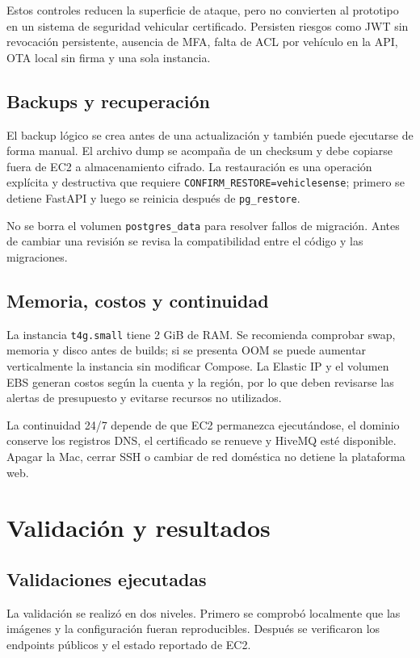 \documentclass[12pt,a4paper,oneside]{report}
\newcommand{\code}[1]{\texttt{\small #1}}
\begin{document}
Estos controles reducen la superficie de ataque, pero no convierten al prototipo en
un sistema de seguridad vehicular certificado. Persisten riesgos como JWT sin
revocación persistente, ausencia de MFA, falta de ACL por vehículo en la API, OTA
local sin firma y una sola instancia.

\section{Backups y recuperación}

El backup lógico se crea antes de una actualización y también puede ejecutarse de
forma manual. El archivo dump se acompaña de un checksum y debe copiarse fuera de
EC2 a almacenamiento cifrado. La restauración es una operación explícita y
destructiva que requiere \code{CONFIRM\_RESTORE=vehiclesense}; primero se detiene
FastAPI y luego se reinicia después de \code{pg\_restore}.

No se borra el volumen \code{postgres\_data} para resolver fallos de migración.
Antes de cambiar una revisión se revisa la compatibilidad entre el código y las
migraciones.

\section{Memoria, costos y continuidad}

La instancia \code{t4g.small} tiene 2 GiB de RAM. Se recomienda comprobar swap,
memoria y disco antes de builds; si se presenta OOM se puede aumentar verticalmente
la instancia sin modificar Compose. La Elastic IP y el volumen EBS generan costos
según la cuenta y la región, por lo que deben revisarse las alertas de presupuesto
y evitarse recursos no utilizados.

La continuidad 24/7 depende de que EC2 permanezca ejecutándose, el dominio conserve
los registros DNS, el certificado se renueve y HiveMQ esté disponible. Apagar la
Mac, cerrar SSH o cambiar de red doméstica no detiene la plataforma web.

\chapter{Validación y resultados}

\section{Validaciones ejecutadas}

La validación se realizó en dos niveles. Primero se comprobó localmente que las
imágenes y la configuración fueran reproducibles. Después se verificaron los
endpoints públicos y el estado reportado de EC2.
\end{document}
